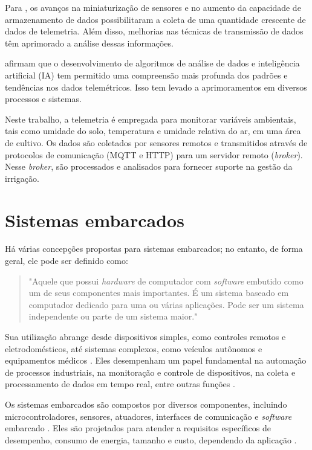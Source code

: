 Para \textcite{Lizhuang_telemetry2021}, os avanços na miniaturização de sensores e no aumento da capacidade de armazenamento de dados possibilitaram a coleta de uma quantidade crescente de dados de telemetria. Além disso, melhorias nas técnicas de transmissão de dados têm aprimorado a análise dessas informações. 

\textcite{Ding_telemetry2017} afirmam que o desenvolvimento de algoritmos de análise de dados e inteligência artificial (IA) tem permitido uma compreensão mais profunda dos padrões e tendências nos dados telemétricos. Isso tem levado a aprimoramentos em diversos processos e sistemas.

Neste trabalho, a telemetria é empregada para monitorar variáveis ambientais, tais como umidade do solo, temperatura e umidade relativa do ar, em uma área de cultivo. Os dados são coletados por sensores remotos e transmitidos através de protocolos de comunicação (MQTT e HTTP) para um servidor remoto (\textit{broker}). Nesse \textit{broker}, são processados e analisados para fornecer suporte na gestão da irrigação.

\section{Sistemas embarcados}
Há várias concepções propostas para sistemas embarcados; no entanto, de forma geral, ele pode ser definido como:

\begin{quote}
"Aquele que possui \textit{hardware} de computador com \textit{software} embutido como um de seus componentes mais importantes. É um sistema baseado em computador dedicado para uma ou várias aplicações. Pode ser um sistema independente ou parte de um sistema maior." \parencite{dutta2014comprehensive}
\end{quote}

Sua utilização abrange desde dispositivos simples, como controles remotos e eletrodomésticos, até sistemas complexos, como veículos autônomos e equipamentos médicos \parencite{lee2008cyber, kato2018autoware}. Eles desempenham um papel fundamental na automação de processos industriais, na monitoração e controle de dispositivos, na coleta e processamento de dados em tempo real, entre outras funções \parencite{dutta2014comprehensive}.

Os sistemas embarcados são compostos por diversos componentes, incluindo microcontroladores, sensores, atuadores, interfaces de comunicação e \textit{software} embarcado \parencite{lee2008cyber}.
Eles são projetados para atender a requisitos específicos de desempenho, consumo de energia, tamanho e custo, dependendo da aplicação \parencite{Mazid_microcontrolador2011}.

